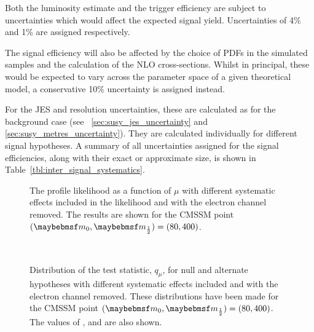 Both the luminosity estimate and the trigger efficiency are subject to
uncertainties which would affect the expected signal yield. Uncertainties of 4\%
and 1\% are assigned respectively.

The signal efficiency will also be affected by the choice of \acp{PDF} in the
simulated samples and the calculation of the \ac{NLO} cross-sections. Whilst in
principal, these would be expected to vary across the parameter space of a given
theoretical model, a conservative 10\% uncertainty is assigned instead.

For the \ac{JES} and \MET resolution uncertainties, these are calculated as for
the background case (see \secs~\ref{sec:susy_jes_uncertainty} and
\ref{sec:susy_metres_uncertainty}). They are calculated individually for
different signal hypotheses. A summary of all uncertainties assigned for the
signal efficiencies, along with their exact or approximate size, is shown in
Table~\ref{tbl:inter_signal_systematics}.



\begin{figure}
\centering
{}\quad
{}
\caption[The profile likelihood as a function of $\mu$]{The profile likelihood
  as a function of $\mu$  with different
  systematic effects included in the likelihood and
   with the electron channel removed. The results
  are shown for the \ac{CMSSM} point $(\Mzero, \Mhalf) = (80, 400)$. }
\label{fig:inter_pl}
\end{figure}

\begin{figure}
\centering
{}
\\
\caption[Distributions of the test statistic, $q_{\mu}$]{Distribution of the
  test statistic, $q_{\mu}$, for null and alternate hypotheses with different
  systematic effects included and with the electron channel removed. These
  distributions have been made for the \ac{CMSSM} point $(\Mzero, \Mhalf) = (80,
  400)$. The values of \CLb, \CLspb and \CLs are also shown.}
\label{fig:inter_cls}
\end{figure}

